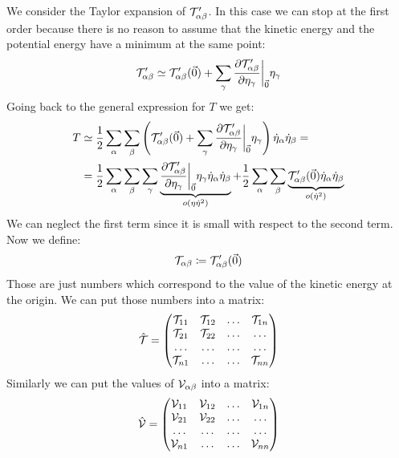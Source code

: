 We consider the Taylor expansion of $\mathcal{T}'_{\alpha \beta}$. In this case we can stop at the first order because there is no reason to assume that the kinetic energy and the potential energy have a minimum at the same point:
\begin{equation}
    \Telegant'_{\alpha \beta} \simeq \Telegant'_{\alpha \beta}(\vec{0}) + \bigsum_{\gamma}\pdv{\Telegant'_{\alpha \beta}}{\eta_{\gamma}}\bigg|_{\vec{0}}\eta_{\gamma}
\end{equation}
Going back to the general expression for $T$ we get:
\begin{equation}
    \begin{split}
        T &\simeq \dfrac{1}{2}\bigsum_{\alpha}\bigsum_{\beta}\brackets{\Telegant'_{\alpha \beta}(\vec{0}) + \bigsum_{\gamma}\pdv{\Telegant'_{\alpha \beta}}{\eta_{\gamma}}\bigg|_{\vec{0}}\eta_{\gamma}} \dot{\eta}_{\alpha}\dot{\eta}_{\beta} =\\
        &= \dfrac{1}{2}\bigsum_{\alpha}\bigsum_{\beta}\bigsum_{\gamma}\underbrace{\pdv{\Telegant'_{\alpha \beta}}{\eta_{\gamma}}\bigg|_{\vec{0}}\eta_{\gamma} \dot{\eta}_{\alpha}\dot{\eta}_{\beta}}_{o(\eta \dot{\eta}^2)} + \dfrac{1}{2}\bigsum_{\alpha}\bigsum_{\beta}\underbrace{\Telegant'_{\alpha \beta}(\vec{0})\dot{\eta}_{\alpha}\dot{\eta}_{\beta}}_{o(\dot{\eta}^2)}
    \end{split}
\end{equation}
We can neglect the first term since it is small with respect to the second term. Now we define:
\begin{equation}
    \mathcal{T}_{\alpha \beta} \coloneqq \mathcal{T}'_{\alpha \beta}(\vec{0})
\end{equation}
Those are just numbers which correspond to the value of the kinetic energy at the origin. We can put those numbers into a matrix:
\begin{equation}
    \hat{\mathcal{T}}=
    \begin{pmatrix}
        \mathcal{T}_{1 1} & \mathcal{T}_{1 2} & \dots & \mathcal{T}_{1 n}\\
        \mathcal{T}_{2 1} & \mathcal{T}_{2 2} & \dots & \dots\\
        \dots & \dots & \dots & \dots\\
        \mathcal{T}_{n 1} & \dots & \dots & \mathcal{T}_{n n}\\
    \end{pmatrix}
\end{equation}
Similarly we can put the values of $\mathcal{V}_{\alpha \beta}$ into a matrix:
\begin{equation}
    \hat{\mathcal{V}}=
    \begin{pmatrix}
        \mathcal{V}_{1 1} & \mathcal{V}_{1 2} & \dots & \mathcal{V}_{1 n}\\
        \mathcal{V}_{2 1} & \mathcal{V}_{2 2} & \dots & \dots\\
        \dots & \dots & \dots & \dots\\
        \mathcal{V}_{n 1} & \dots & \dots & \mathcal{V}_{n n}\\
    \end{pmatrix}
\end{equation}
